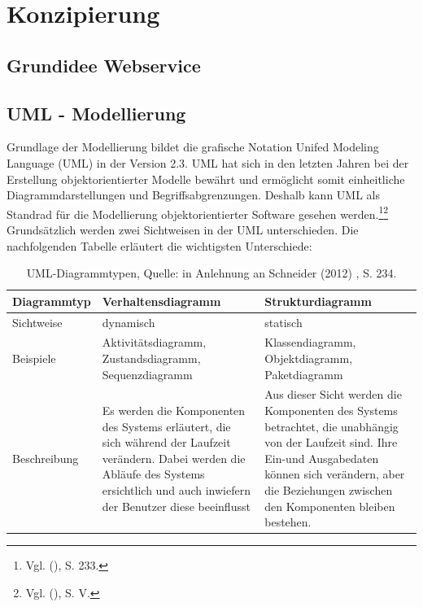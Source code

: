 \section{Konzipierung}

\subsection{Grundidee Webservice }


\subsection{UML - Modellierung}
\noindent
Grundlage der Modellierung bildet die grafische Notation Unifed Modeling Language (UML) in der Version 2.3. UML hat sich in den letzten Jahren bei der Erstellung objektorientierter Modelle bewährt und ermöglicht somit einheitliche Diagrammdarstellungen und Begriffsabgrenzungen. Deshalb kann UML als Standrad für die Modellierung objektorientierter Software gesehen werden.\footnote{Vgl. \citeauthor{Schneider} (\citeyear{Schneider}), S. 233.}\footnote{Vgl. \citeauthor{Balzert} (\citeyear{Balzert}), S. V.} \newline
Grundsätzlich werden zwei Sichtweisen in der UML unterschieden. Die nachfolgenden Tabelle erläutert die wichtigsten Unterschiede:

\begin{table}[h!]
    \begin{tabular}{ | p{2.5cm}| p{6cm} | p{6cm} |}
    \hline
    Diagrammtyp & Verhaltensdiagramm & Strukturdiagramm \\ \hline
   Sichtweise & dynamisch & statisch \\ \hline
   Beispiele & Aktivitätsdiagramm, Zustandsdiagramm, Sequenzdiagramm &  Klassendiagramm, 
   Objektdiagramm, Paketdiagramm\\ \hline
   Beschreibung &  Es werden die Komponenten des Systems erläutert, die sich während der Laufzeit 
   verändern. Dabei werden die Abläufe des Systems ersichtlich und auch inwiefern der Benutzer diese 
   beeinflusst & Aus dieser Sicht werden die Komponenten des Systems betrachtet, die unabhängig von 
   der Laufzeit sind. Ihre Ein-und Ausgabedaten können sich verändern, aber die Beziehungen zwischen 
   den Komponenten bleiben bestehen. \\ \hline  
    \end{tabular}
    \caption{UML-Diagrammtypen, Quelle: in Anlehnung an Schneider (2012) , S. 234.}
\end{table}


